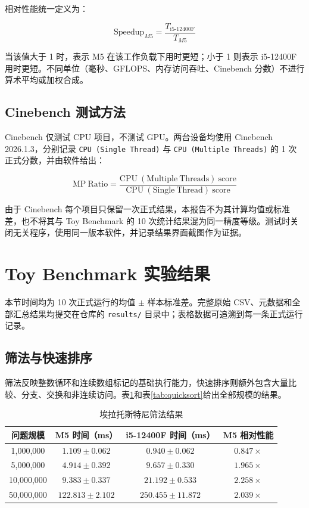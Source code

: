 \documentclass[UTF8,a4paper,12pt]{ctexart}
\begin{document}
相对性能统一定义为：

\[
\mathrm{Speedup}_{M5} = \frac{T_{\mathrm{i5\text{-}12400F}}}{T_{M5}}
\]

当该值大于 1 时，表示 M5 在该工作负载下用时更短；小于 1 则表示 i5-12400F 用时更短。不同单位（毫秒、GFLOPS、内存访问吞吐、Cinebench 分数）不进行算术平均或加权合成。

\subsection{Cinebench 测试方法}

Cinebench 仅测试 CPU 项目，不测试 GPU。两台设备均使用 Cinebench 2026.1.3，分别记录 \texttt{CPU (Single Thread)} 与 \texttt{CPU (Multiple Threads)} 的 1 次正式分数，并由软件给出：

\[
\mathrm{MP\ Ratio}=\frac{\mathrm{CPU\ (Multiple\ Threads)\ score}}{\mathrm{CPU\ (Single\ Thread)\ score}}
\]

由于 Cinebench 每个项目只保留一次正式结果，本报告不为其计算均值或标准差，也不将其与 Toy Benchmark 的 10 次统计结果混为同一精度等级。测试时关闭无关程序，使用同一版本软件，并记录结果界面截图作为证据。

\section{Toy Benchmark 实验结果}

本节时间均为 10 次正式运行的均值 $\pm$ 样本标准差。完整原始 CSV、元数据和全部汇总结果均提交在仓库的 \texttt{results/} 目录中；表格数据可追溯到每一条正式运行记录。

\subsection{筛法与快速排序}

筛法反映整数循环和连续数组标记的基础执行能力，快速排序则额外包含大量比较、分支、交换和非连续访问。表\ref{tab:sieve}和表\ref{tab:quicksort}给出全部规模的结果。

\begin{table}[H]
    \centering
    \renewcommand{\arraystretch}{1.35}
    \caption{埃拉托斯特尼筛法结果}
    \label{tab:sieve}
    \begin{tabular}{c c c c}
        \hline
        问题规模 & M5 时间（ms） & i5-12400F 时间（ms） & M5 相对性能 \\
        \hline
        1,000,000 & $1.109 \pm 0.062$ & $0.940 \pm 0.062$ & $0.847\times$ \\
        5,000,000 & $4.914 \pm 0.392$ & $9.657 \pm 0.330$ & $1.965\times$ \\
        10,000,000 & $9.383 \pm 0.337$ & $21.192 \pm 0.533$ & $2.258\times$ \\
        50,000,000 & $122.813 \pm 2.102$ & $250.455 \pm 11.872$ & $2.039\times$ \\
        \hline
    \end{tabular}
\end{table}
\end{document}
